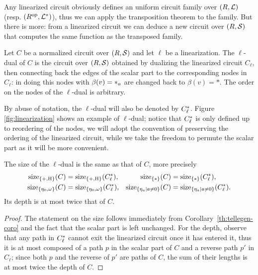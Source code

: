 Any linearized circuit obviously defines an uniform circuit family
over $(R,\mathcal{L})$ (resp. $(R^{\mathrm{op}},\mathcal{L}^\ast)$), thus we can apply
the transposition theorem to the family. But there is more: from a
linearized circuit we can deduce a new circuit over $(R,\mathcal{S})$ that
computes the same function as the transposed family.

\begin{definition}
  \label{def:ell-dual}
  Let $C$ be a normalized circuit over $(R,\mathcal{S})$ and let $\ell$ be
  a linearization.  The $\ell$-dual of $C$ is the circuit over
  $(R,\mathcal{S})$ obtained by dualizing the linearized circuit $C_\ell$,
  then connecting back the edges of the scalar part to the
  corresponding nodes in $C_\ell$: in doing this nodes with
  $\beta(v)=*_{a}$ are changed back to $\beta(v)=*$. The order on
  the nodes of the $\ell$-dual is arbitrary.
\end{definition}

By abuse of notation, the $\ell$-dual will also be denoted by
$C_\ell^\ast$. Figure \ref{fig:linearization} shows an example of
$\ell$-dual; notice that $C_\ell^\ast$ is only defined up to
reordering of the nodes, we will adopt the convention of preserving
the ordering of the linearized circuit, while we take the freedom to
permute the scalar part as it will be more convenient.

\begin{proposition}
  \label{th:tellegen-multi}
  The size of the $\ell$-dual is the same as that of $C$, more
  precisely
  \begin{align*}
    \operatorname{size}_{\{+,\operatorname{H}\}}(C) &= \operatorname{size}_{\{+,\operatorname{H}\}}(C_\ell^\ast), 
    &\operatorname{size}_{\{*\}}(C) &= \operatorname{size}_{\{*\}}(C_\ell^\ast),\\
    \operatorname{size}_{\{\eta_0,\omega\}}(C) &= \operatorname{size}_{\{\eta_0,\omega\}}(C_\ell^\ast), 
    &\operatorname{size}_{\{\eta_a|a\ne0\}}(C) &= \operatorname{size}_{\{\eta_a|a\ne0\}}(C_\ell^\ast).
  \end{align*}
  Its depth is at most twice that of $C$.
\end{proposition}
\begin{proof}
    The statement on the size follows
  immediately from Corollary~\ref{th:tellegen-coro} and the fact that
  the scalar part is left unchanged. For the depth, observe that any
  path in $C_\ell^\ast$ cannot exit the linearized circuit once it
  has entered it, thus it is at most composed of a path $p$ in the
  scalar part of $C$ and a reverse path $p'$ in $C_\ell$; since both
  $p$ and the reverse of $p'$ are paths of $C$, the sum of their
  lengths is at most twice the depth of $C$.
\end{proof}

